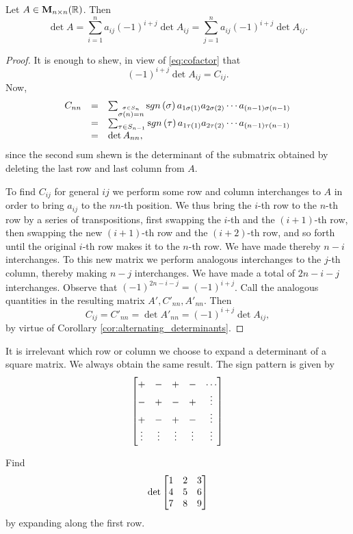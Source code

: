 \begin{thm}\label{thm:laplace_expansion}
Let $A\in{\mathbf M}_{n\times n}( \mathbb{R})$. Then $$\det A = \sum _{i = 1} ^n
a_{ij}(-1)^{i + j}\det A_{ij} = \sum _{j = 1} ^n a_{ij}(-1)^{i +
j}\det A_{ij}.
$$
\end{thm}
\begin{proof}
It is enough to shew, in view of  \ref{eq:cofactor} that
$$ (-1)^{i + j}\det A_{ij} =  C_{ij}. $$Now,
$$\begin{array}{lll}C_{nn} & = & \sum _{\stackrel{\sigma\in S_n}{\sigma (n) = n}} \sgn{\sigma} a_{1\sigma (1)}a_{2\sigma (2)}\cdots a_{(n-1)\sigma (n-1)}
 \\ & = & \sum _{\tau\in S_{n-1}} \sgn{\tau} a_{1\tau (1)}a_{2\tau (2)}\cdots a_{(n - 1)\tau (n -1)} \\ & = & \det
A_{nn},\end{array}$$since the second sum shewn is the determinant
of the submatrix obtained by deleting the last row and last column
from $A$.

\bigskip


To find $C_{ij}$ for general $ij$ we perform some row and column
interchanges to $A$ in order to bring $a_{ij}$ to the $nn$-th
position. We thus bring the $i$-th row to the $n$-th row by a
series of transpositions, first swapping the $i$-th and the $(i +
1)$-th row, then swapping the new $(i + 1)$-th row and the $(i +
2)$-th row, and so forth until the original $i$-th row makes it to
the $n$-th row. We have made thereby $n - i$ interchanges. To this
new matrix we perform analogous interchanges to the $j$-th column,
thereby making $n - j$ interchanges. We have made a total of $2n -
i - j$ interchanges. Observe that $(-1)^{2n - i - j} = (-1)^{i +
j}$. Call the analogous quantities in the resulting matrix $A',
C'_{nn}, A'_{nn} $. Then
$$C_{ij} = C'_{nn} = \det A'_{nn} = (-1)^{i + j}\det A_{ij},
$$by virtue of Corollary \ref{cor:alternating_determinants}.

\end{proof}
\begin{rem}
It is irrelevant which row or column we choose to expand a
determinant of a square matrix. We always obtain the same result.
The sign pattern is given by $$\begin{bmatrix} + & - & + & - &
\cdots \cr - & + & - & + & \vdots \cr + & - & + & - & \vdots \cr
 \vdots  & \vdots  & \vdots  &  \vdots  & \vdots \cr
\end{bmatrix}
$$
\end{rem}
\begin{exa}
Find $$\det\begin{bmatrix} 1 & 2 & 3 \cr 4 & 5 & 6 \cr  7 & 8 & 9
\cr
\end{bmatrix}$$by expanding along the first row.
\end{exa}
